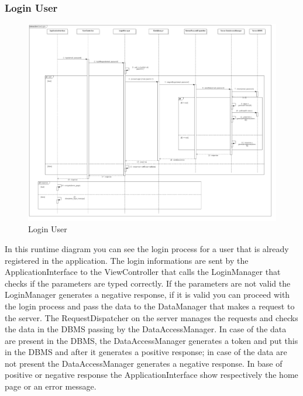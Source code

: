 \subsubsection{Login User}
\begin{figure}[H]
\centering
\includegraphics[scale=0.25]{images/UserLogin}
\caption{Login User}
\end{figure}In this runtime diagram you can see the login process for a user that is already registered in the application. The login informations are sent by the ApplicationInterface to the ViewController that calls the LoginManager that checks if the parameters are typed correctly. If the parameters are not valid the LoginManager generates a negative response, if it is valid you can proceed with the login process and pass the data to the DataManager that makes a request to the server. The RequestDispatcher on the server manages the requests and checks the data in the DBMS passing by the DataAccessManager. In case of the data are present in the DBMS, the DataAccessManager generates a token and put this in the DBMS and after it generates a positive response; in case of the data are not present the DataAccessManager generates a negative response. In base of positive or negative response the ApplicationInterface show respectively the home page or an error message.

